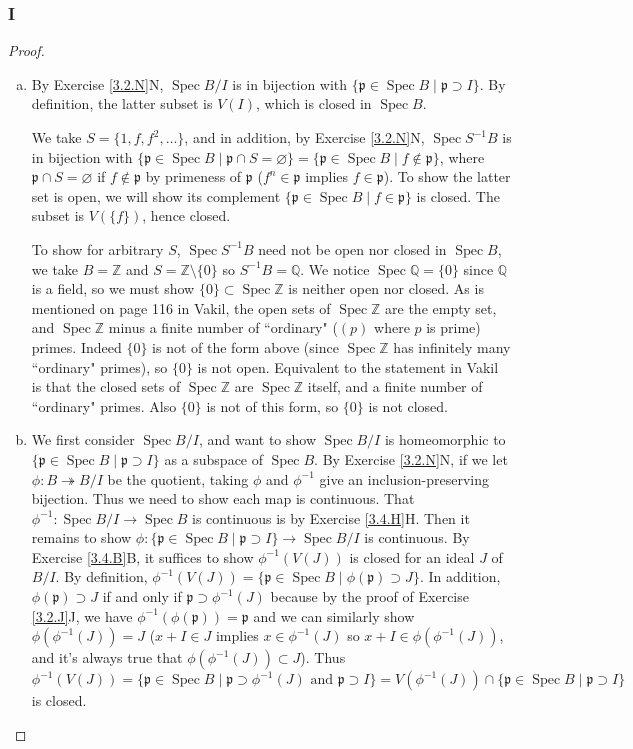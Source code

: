 \documentclass{article}
\newcommand{\Z}{\mathbb{Z}}
\newcommand{\Q}{\mathbb{Q}}
\newcommand{\frkp}{\mathfrak{p}}
\DeclareMathOperator{\Spec}{\mathrm{Spec}}
\let\emptyset\varnothing
\begin{document}
\subsubsection{I}\label{3.4.I}
\begin{proof}
    \begin{enumerate}[(a)]
        \item By Exercise \ref{3.2.N}N, $\Spec B/I$ is in bijection with $\{ \frkp \in \Spec B \mid \frkp \supset I\}$. By definition, the latter subset is $V(I)$, which is closed in $\Spec B$.
        
        We take $S=\{1,f,f^2,\dots\}$, and in addition, by Exercise \ref{3.2.N}N, $\Spec S^{-1} B$ is in bijection with $\{ \frkp \in \Spec B \mid \frkp \cap S = \emptyset \} =\{ \frkp \in \Spec B \mid f\notin \frkp \}$, where $\frkp \cap S = \emptyset$ if $f \notin \frkp$ by primeness of $\frkp$ ($f^n \in \frkp$ implies $f\in \frkp$). To show the latter set is open, we will show its complement $\{\frkp \in \Spec B \mid f \in \frkp \}$ is closed. The subset is $V(\{f\})$, hence closed.

        To show for arbitrary $S$, $\Spec S^{-1}B$ need not be open nor closed in $\Spec B$, we take $B=\Z$ and $S=\Z\setminus \{0\}$ so $S^{-1}B=\Q$. We notice $\Spec \Q = \{ 0\}$ since $\Q$ is a field, so we must show $\{0\}\subset \Spec \Z$ is neither open nor closed. As is mentioned on page 116 in Vakil, the open sets of $\Spec \Z$ are the empty set, and $\Spec \Z$ minus a finite number of ``ordinary" ($(p)$ where $p$ is prime) primes. Indeed $\{0\}$ is not of the form above (since $\Spec \Z$ has infinitely many ``ordinary" primes), so $\{0\}$ is not open. Equivalent to the statement in Vakil is that the closed sets of $\Spec \Z$ are $\Spec \Z$ itself, and a finite number of ``ordinary" primes. Also $\{0\}$ is not of this form, so $\{0\}$ is not closed.
        \item We first consider $\Spec B/I$, and want to show $\Spec B/I$ is homeomorphic to $\{ \frkp \in \Spec B \mid \frkp \supset I\}$ as a subspace of $\Spec B$. By Exercise \ref{3.2.N}N, if we let $\phi:B\twoheadrightarrow B/I$ be the quotient, taking $\phi$ and $\phi^{-1}$ give an inclusion-preserving bijection. Thus we need to show each map is continuous. That $\phi^{-1}:\Spec B/I \to \Spec B$ is continuous is by Exercise \ref{3.4.H}H. Then it remains to show $\phi:\{ \frkp \in \Spec B \mid \frkp \supset I\}\to \Spec B/I$ is continuous. By Exercise \ref{3.4.B}B, it suffices to show $\phi^{-1}(V(J))$ is closed for an ideal $J$ of $B/I$. By definition, $\phi^{-1}(V(J))=\{\frkp \in \Spec B \mid \phi(\frkp)\supset J\}$. In addition, $\phi(\frkp)\supset J$ if and only if $\frkp \supset \phi^{-1}(J)$ because by the proof of Exercise \ref{3.2.J}J, we have $\phi^{-1}(\phi(\frkp))=\frkp$ and we can similarly show $\phi(\phi^{-1}(J))=J$ ($x+I\in J$ implies $x\in \phi^{-1}(J)$ so $x+I \in \phi(\phi^{-1}(J))$, and it's always true that $\phi(\phi^{-1}(J))\subset J$). Thus $\phi^{-1}(V(J))=\{\frkp \in \Spec B \mid \frkp \supset \phi^{-1}(J) \text{ and } \frkp \supset I\}=V(\phi^{-1}(J))\cap \{ \frkp \in \Spec B \mid \frkp \supset I\}$ is closed.


\end{enumerate}
\end{proof}
\end{document}
